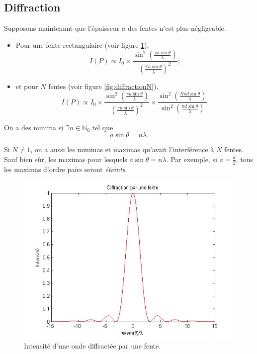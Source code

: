 
\subsection{Diffraction}
Supposons maintenant que l'épaisseur $a$ des fentes n'est plus
négligeable.
\begin{itemize}
  \item Pour une fente rectangulaire (voir figure \ref{fig:diffraction1}),
    \[ I(P) \propto I_0 \times
      \frac{\sin^2\left(\frac{\pi a \sin\theta}{\lambda}\right)}
    {\left(\frac{\pi a \sin\theta}{\lambda}\right)^2}; \]
  \item et pour $N$ fentes (voir figure \ref{fig:diffractionN}),
    \[ I(P) \propto I_0 \times
      \frac{\sin^2\left(\frac{\pi a \sin\theta}{\lambda}\right)}
      {\left(\frac{\pi a \sin\theta}{\lambda}\right)^2} \times
      \frac{\sin^2\left(\frac{N \pi d \sin\theta}{\lambda}\right)}
    {\sin^2\left(\frac{\pi d \sin\theta}{\lambda}\right)}. \]
\end{itemize}
On a des minima si $\exists n \in \mathbb{N}_0$ tel que
\[ a \sin \theta = n\lambda. \]

Si $N \neq 1$, on a aussi les minimas et maximas qu'avait
l'interférence à $N$ fentes.
Sauf bien sûr, les maximas pour lesquels $a\sin\theta = n\lambda$.
Par exemple, si $a = \frac{d}{2}$, tous les maximas d'ordre pairs
seront \emph{éteints}.

\begin{figure}[ht!]
	\centering
	\includegraphics[scale=0.6]{diffraction1.jpg}
	\caption{Intensité d'une onde diffractée par une fente.}
	\label{fig:diffraction1}
\end{figure}

